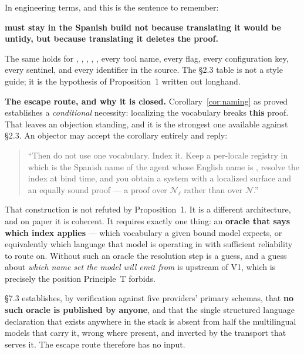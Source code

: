 In engineering terms, and this is the sentence to remember:

\begin{keyinsight}
\textbf{ must stay  in the Spanish build not because
translating it would be untidy, but because translating it deletes the proof.}
\end{keyinsight}

The same holds for , , ,
, , every tool name, every flag, every
configuration key, every sentinel, and every identifier in the source. The
\S2.3 table is not a style guide; it is the hypothesis of Proposition~1 written
out longhand.

\textbf{The escape route, and why it is closed.} Corollary~\ref{cor:naming} as
proved establishes a \emph{conditional} necessity: localizing the vocabulary
breaks \textbf{this} proof. That leaves an objection standing, and it is the
strongest one available against \S2.3. An objector may accept the corollary
entirely and reply:

\begin{quote}
``Then do not use one vocabulary. Index it. Keep a per-locale registry in which
 is the Spanish name of the agent whose English name is
, resolve the index at bind time, and you obtain a system with a
localized surface and an equally sound proof --- a proof over
$\mathcal{N}_\ell$ rather than over $\mathcal{N}$.''
\end{quote}

That construction is not refuted by Proposition~1. It is a different
architecture, and on paper it is coherent. It requires exactly one thing: an
\textbf{oracle that says which index applies} --- which vocabulary a given bound
model expects, or equivalently which language that model is operating in with
sufficient reliability to route on. Without such an oracle the resolution step
is a guess, and a guess about \emph{which name set the model will emit from} is
upstream of V1, which is precisely the position Principle~T forbids.

\S7.3 establishes, by verification against five providers' primary schemas,
that \textbf{no such oracle is published by anyone}, and that the single
structured language declaration that exists anywhere in the stack is absent
from half the multilingual models that carry it, wrong where present, and
inverted by the transport that serves it. The escape route therefore has no
input.

